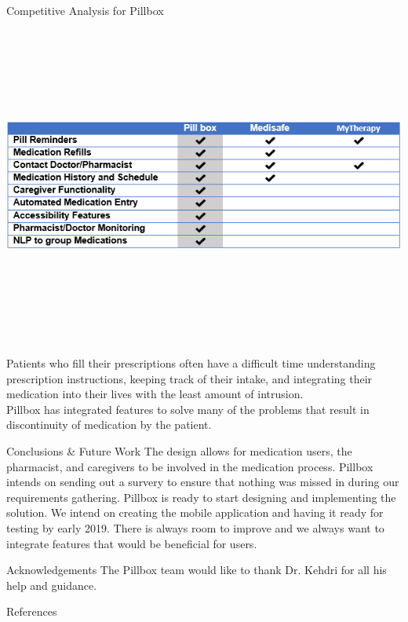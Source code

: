 \documentclass[22pt]{beamer}
\begin{document}
\begin{frame}[fragile]
\begin{textblock}{7.25}
\begin{block}{Competitive Analysis for Pillbox}
\begin{center}
\includegraphics[height=10.5cm]{CompetitiveAdvantage.png}
\end{center}
Patients who fill their prescriptions often have a difficult time understanding prescription instructions, keeping track of their intake, and integrating their medication into their lives with the least amount of intrusion.\\
Pillbox has integrated features to solve many of the problems that result in discontinuity of medication by the patient.
\end{block}

\begin{block}{Conclusions \& Future Work}
The design allows for medication users, the pharmacist, and caregivers to be involved in the medication process. Pillbox intends on sending out a survery to ensure that nothing was missed in during our requirements gathering. Pillbox is ready to start designing and implementing the solution. We intend on creating the mobile application and having it ready for testing by early 2019. There is always room to improve and we always want to integrate features that would be beneficial for users.
\end{block}


\begin{block}{Acknowledgements}
The Pillbox team would like to thank Dr. Kehdri for all his help and guidance.
\end{block}


\begin{block}{References}

{\scriptsize
}
\end{block}


\end{textblock}


\end{frame}
\end{document}
